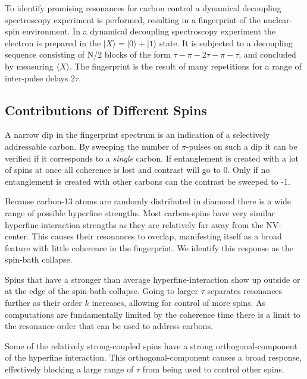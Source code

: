 To identify promising resonances for carbon control a dynamical decoupling spectroscopy experiment is performed, resulting in a fingerprint of the nuclear-spin environment\citep{Taminiau2012Detection}.
In a dynamical decoupling spectroscopy experiment the electron is prepared in the $|X\rangle = |0\rangle +|1\rangle$ state. It is subjected to a decoupling sequence consisting of N/2 blocks of the form {$\tau - \pi -2\tau-\pi-\tau$}, and concluded by measuring $\langle X\rangle $. The fingerprint is the result of many repetitions for a range of inter-pulse delays $2\tau$.

\subsection*{Contributions of Different Spins }%

A narrow dip in the fingerprint spectrum is an indication of a selectively addressable carbon.
By sweeping the number of $\pi$-pulses on such a dip it can be verified if it corresponds to a \emph{single} carbon.
If entanglement is created with a lot of spins at once all coherence is lost and contrast will go to 0.
Only if no entanglement is created with other carbons can the contrast be sweeped to -1. %

Because carbon-13 atoms are randomly distributed in diamond there is a wide range of possible hyperfine strengths.
Most carbon-spins have very similar hyperfine-interaction strengths as they are relatively far away from the NV-center. This causes their resonances to overlap, manifesting itself as a broad feature with little coherence in the fingerprint. We identify this response as the spin-bath collapse.

Spins that have a stronger than average hyperfine-interaction show up outside or at the edge of the spin-bath collapse. Going to larger $\tau$ separates resonances further as their order $k$ increases, allowing for control of more spins.
 As computations are fundamentally limited by the coherence time there is a limit to the resonance-order that can be used to address carbons.

  Some of the relatively strong-coupled spins have a strong orthogonal-component of the hyperfine interaction. This orthogonal-component causes a broad response, effectively blocking a large range of $\tau$ from being used to control other spins.

